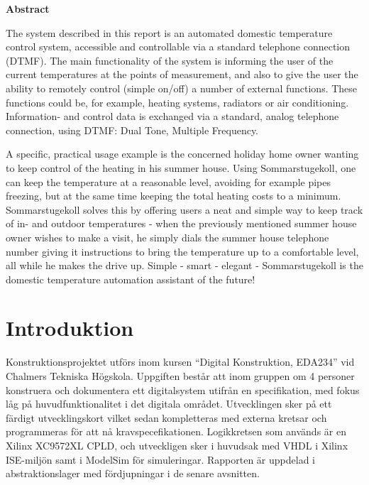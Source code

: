 \documentclass[a4paper,11pt]{article}
\begin{document}
\begin{center}
	{\noindent \bf Abstract}
\end{center}

	The system described in this report is an automated domestic temperature control system, accessible and controllable via
	a standard telephone connection (DTMF). The main functionality of the system is informing the user of the current temperatures
	at the points of measurement, and also to give the user the ability to remotely control (simple on/off) a number of external
	functions. These functions could be, for example, heating systems, radiators or air conditioning. Information- and control data
	is exchanged via a standard, analog telephone connection, using DTMF: Dual Tone, Multiple Frequency.

	A specific, practical usage example is the concerned holiday home owner wanting to keep control of the heating in his summer house.
	Using Sommarstugekoll, one can keep the temperature at a reasonable level, avoiding for example pipes freezing, but at the same time
	keeping the total heating costs to a minimum. Sommarstugekoll solves this by offering users a neat and simple way to keep track
	of in- and outdoor temperatures - when the previously mentioned summer house owner wishes to make a visit, he simply dials the
	summer house telephone number giving it instructions to bring the temperature up to a comfortable level, all while he makes
	the drive up. Simple - smart - elegant - Sommarstugekoll is the domestic temperature automation assistant of the future!

\pagebreak

\section{Introduktion}

	Konstruktionsprojektet utförs inom kursen ``Digital Konstruktion, EDA234'' vid Chalmers Tekniska Högskola. Uppgiften består att inom gruppen om 4 personer konstruera och dokumentera
	ett digitalsystem utifrån en specifikation, med fokus låg på huvudfunktionalitet i det digitala området. Utvecklingen sker på ett färdigt utvecklingskort vilket sedan kompletteras med externa kretsar och programmeras för att nå kravspecefikationen. Logikkretsen som används är en Xilinx XC9572XL CPLD, och utveckligen sker i huvudsak med VHDL i Xilinx ISE-miljön samt i ModelSim för simuleringar. Rapporten är uppdelad i abstraktionslager med fördjupningar i de senare avsnitten. 
\end{document}
